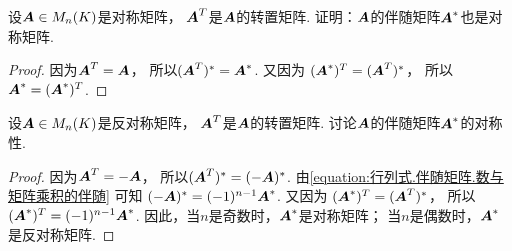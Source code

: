 \begin{example}
设\(\boldsymbol{A} \in M_n(K)\)是对称矩阵，
\(\boldsymbol{A}^T\)是\(\boldsymbol{A}\)的转置矩阵.
证明：\(\boldsymbol{A}\)的伴随矩阵\(\boldsymbol{A}^*\)也是对称矩阵.
\begin{proof}
因为\(\boldsymbol{A}^T = \boldsymbol{A}\)，
所以\((\boldsymbol{A}^T)^* = \boldsymbol{A}^*\).
又因为 \hyperref[equation:行列式.伴随矩阵.恒等式2]{\((\boldsymbol{A}^*)^T = (\boldsymbol{A}^T)^*\)}，
所以\(\boldsymbol{A}^* = (\boldsymbol{A}^*)^T\).
\end{proof}
\end{example}
\begin{example}
设\(\boldsymbol{A} \in M_n(K)\)是反对称矩阵，
\(\boldsymbol{A}^T\)是\(\boldsymbol{A}\)的转置矩阵.
讨论\(\boldsymbol{A}\)的伴随矩阵\(\boldsymbol{A}^*\)的对称性.
\begin{proof}
因为\(\boldsymbol{A}^T = -\boldsymbol{A}\)，
所以\((\boldsymbol{A}^T)^* = (-\boldsymbol{A})^*\).
由\cref{equation:行列式.伴随矩阵.数与矩阵乘积的伴随} 可知
\((-\boldsymbol{A})^* = (-1)^{n-1} \boldsymbol{A}^*\).
又因为 \hyperref[equation:行列式.伴随矩阵.恒等式2]{\((\boldsymbol{A}^*)^T = (\boldsymbol{A}^T)^*\)}，
所以\((\boldsymbol{A}^*)^T = (-1)^{n-1} \boldsymbol{A}^*\).
因此，当\(n\)是奇数时，\(\boldsymbol{A}^*\)是对称矩阵；
当\(n\)是偶数时，\(\boldsymbol{A}^*\)是反对称矩阵.
\end{proof}
\end{example}

